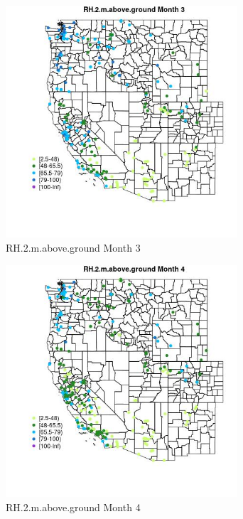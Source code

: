 \begin{figure} 
\centering  
\includegraphics[width=0.77\textwidth]{Code_Outputs/Report_ML_input_PM25_Step4_part_e_de_duplicated_aveswNAs_MapObsMo3RH2maboveground.jpg} 
\caption{\label{fig:Report_ML_input_PM25_Step4_part_e_de_duplicated_aveswNAsMapObsMo3RH2maboveground}RH.2.m.above.ground Month 3} 
\end{figure} 
 

\begin{figure} 
\centering  
\includegraphics[width=0.77\textwidth]{Code_Outputs/Report_ML_input_PM25_Step4_part_e_de_duplicated_aveswNAs_MapObsMo4RH2maboveground.jpg} 
\caption{\label{fig:Report_ML_input_PM25_Step4_part_e_de_duplicated_aveswNAsMapObsMo4RH2maboveground}RH.2.m.above.ground Month 4} 
\end{figure} 
 

